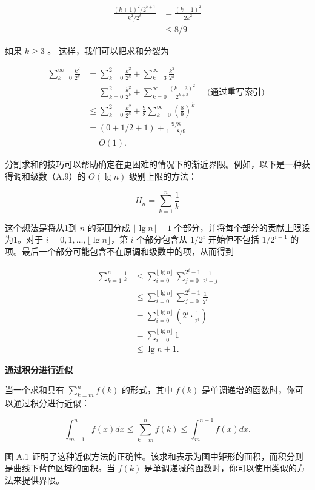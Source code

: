 \documentclass[lang=cn,newtx,10pt,scheme=chinese]{elegantbook}
\begin{document}
$$
\begin{aligned}
\frac{(k+1)^2 / 2^{k+1}}{k^2 / 2^k} & =\frac{(k+1)^2}{2 k^2} \\
& \leq 8 / 9
\end{aligned}
$$

如果 $k \geq 3$ 。 这样，我们可以把求和分裂为

$$
\begin{aligned}
\sum_{k=0}^{\infty} \frac{k^2}{2^k} & =\sum_{k=0}^2 \frac{k^2}{2^k}+\sum_{k=3}^{\infty} \frac{k^2}{2^k} \\
& =\sum_{k=0}^2 \frac{k^2}{2^k}+\sum_{k=0}^{\infty} \frac{(k+3)^2}{2^{k+3}} \quad \text { (通过重写索引) } \\
& \leq \sum_{k=0}^2 \frac{k^2}{2^k}+\frac{9}{8} \sum_{k=0}^{\infty}(\frac{8}{9})^k \\
& =(0+1 / 2+1)+\frac{9 / 8}{1-8 / 9} \\
& =O(1) .
\end{aligned}
$$

分割求和的技巧可以帮助确定在更困难的情况下的渐近界限。例如，以下是一种获得调和级数（A.9）的 $O(\lg n)$ 级别上限的方法：

$$
H_n=\sum_{k=1}^n \frac{1}{k}
$$

这个想法是将从1到 $n$ 的范围分成 $\lfloor\lg n\rfloor+1$ 个部分，并将每个部分的贡献上限设为1。对于 $i=0,1, \ldots,\lfloor\lg n\rfloor$，第 $i$ 个部分包含从 $1 / 2^i$ 开始但不包括 $1 / 2^{i+1}$ 的项。最后一个部分可能包含不在原调和级数中的项，从而得到

$$
\begin{aligned}
\sum_{k=1}^n \frac{1}{k} & \leq \sum_{i=0}^{\lfloor\lg n\rfloor} \sum_{j=0}^{2^i-1} \frac{1}{2^i+j} \\
& \leq \sum_{i=0}^{\lfloor\lg n\rfloor} \sum_{j=0}^{2^i-1} \frac{1}{2^i} \\
& =\sum_{i=0}^{\lfloor\lg n\rfloor}(2^i \cdot \frac{1}{2^i}) \\
& =\sum_{i=0}^{\lfloor\lg n\rfloor} 1 \\
& \leq \lg n+1 .
\end{aligned}
$$

\textbf{通过积分进行近似}

当一个求和具有 $\sum_{k=m}^n f(k)$ 的形式，其中 $f(k)$ 是单调递增的函数时，你可以通过积分进行近似：

$$
\int_{m-1}^n f(x) d x \leq \sum_{k=m}^n f(k) \leq \int_m^{n+1} f(x) d x .
$$

图 A.1 证明了这种近似方法的正确性。该求和表示为图中矩形的面积，而积分则是曲线下蓝色区域的面积。当 $f(k)$ 是单调递减的函数时，你可以使用类似的方法来提供界限。
\end{document}
